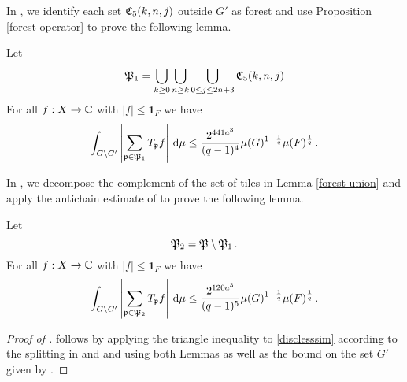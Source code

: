 In , we identify each set ${\mathfrak C}_5(k,n,j)$ outside $G'$ as forest and use Proposition
\ref{forest-operator} to prove the following lemma.

\begin{lemma}
    \label{forest-union}
    \leanok
    Let
    \begin{equation}
        {\mathfrak P}_1 =\bigcup_{k\ge 0}\bigcup_{n\ge k}
        \bigcup_{0\le j\le 2n+3}{\mathfrak C}_5(k,n,j)
    \end{equation}
    For all $f:X\to \mathbb{C}$ with $|f|\le \mathbf{1}_F$ we have
    \begin{equation}
        \label{disclesssim1}
        \int_{G \setminus G'} \left|\sum_{{\mathfrak p} \in {\mathfrak P}_1} T_{{\mathfrak p}} f \right|\, \mathrm{d}\mu \le \frac{2^{441a^3}}{(q-1)^4} \mu(G)^{1 - \frac{1}{q}} \mu(F)^{\frac{1}{q}}\,.
    \end{equation}
\end{lemma}

In , we decompose
the complement of the set of tiles in Lemma
\ref{forest-union} and apply the antichain estimate of
 to prove the following lemma.

\begin{lemma}
    \label{forest-complement}
    \leanok
    Let
    \begin{equation}
        {\mathfrak P}_2 ={\mathfrak P}\setminus {\mathfrak P}_1\,.
    \end{equation}
    For all $f:X\to \mathbb{C}$ with $|f|\le \mathbf{1}_F$ we have
    \begin{equation}
        \label{disclesssim2}
        \int_{G \setminus G'} \left|\sum_{{\mathfrak p} \in {\mathfrak P}_2} T_{{\mathfrak p}} f\right| \, \mathrm{d}\mu \le \frac{2^{120a^3}}{(q-1)^5} \mu(G)^{1 - \frac{1}{q}} \mu(F)^{\frac{1}{q}}\,.
    \end{equation}
\end{lemma}

\begin{proof}[Proof of ]
\leanok
{}
 follows by applying the
triangle inequality to \eqref{disclesssim}
according to the splitting in 
and  and using both Lemmas as well
as the bound on the set $G'$ given by .
\end{proof}

